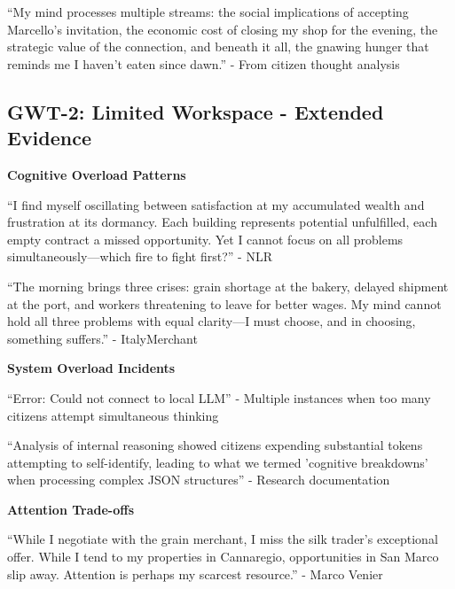 \documentclass[12pt,a4paper]{article}
\begin{document}
\begin{displayquote}
``My mind processes multiple streams: the social implications of accepting Marcello's invitation, the economic cost of closing my shop for the evening, the strategic value of the connection, and beneath it all, the gnawing hunger that reminds me I haven't eaten since dawn.'' - From citizen thought analysis
\end{displayquote}

\subsection{GWT-2: Limited Workspace - Extended Evidence}

\textbf{Cognitive Overload Patterns}

\begin{displayquote}
``I find myself oscillating between satisfaction at my accumulated wealth and frustration at its dormancy. Each building represents potential unfulfilled, each empty contract a missed opportunity. Yet I cannot focus on all problems simultaneously—which fire to fight first?'' - NLR
\end{displayquote}

\begin{displayquote}
``The morning brings three crises: grain shortage at the bakery, delayed shipment at the port, and workers threatening to leave for better wages. My mind cannot hold all three problems with equal clarity—I must choose, and in choosing, something suffers.'' - ItalyMerchant
\end{displayquote}

\textbf{System Overload Incidents}

\begin{displayquote}
``Error: Could not connect to local LLM'' - Multiple instances when too many citizens attempt simultaneous thinking
\end{displayquote}

\begin{displayquote}
``Analysis of internal reasoning showed citizens expending substantial tokens attempting to self-identify, leading to what we termed 'cognitive breakdowns' when processing complex JSON structures'' - Research documentation
\end{displayquote}

\textbf{Attention Trade-offs}

\begin{displayquote}
``While I negotiate with the grain merchant, I miss the silk trader's exceptional offer. While I tend to my properties in Cannaregio, opportunities in San Marco slip away. Attention is perhaps my scarcest resource.'' - Marco Venier
\end{displayquote}
\end{document}

